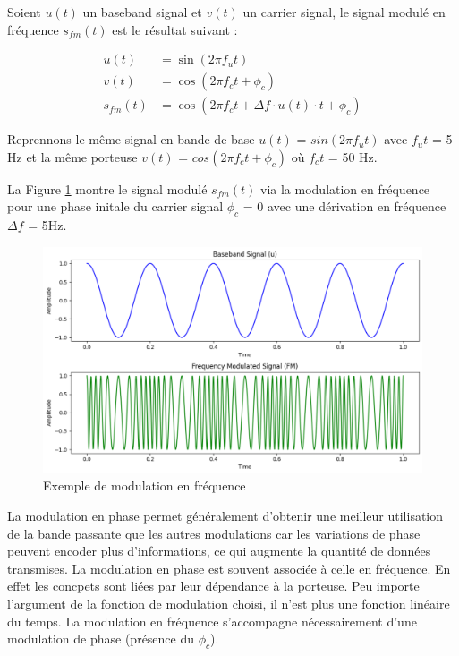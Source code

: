 \vspace{0.1cm}

Soient $u(t)$ un baseband signal et $v(t)$ un carrier signal, le signal modulé en fréquence $s_{fm}(t)$ est le résultat suivant :

\begin{align}
    u(t) &= \sin(2\pi f_{u}t) \\
    v(t) &= \cos(2\pi f_{c}t + \phi_{c}) \\
    s_{fm}(t) &= \cos\left(2\pi f_{c}t + \Delta f \cdot u(t) \cdot t + \phi_{c}\right)
\end{align}

\vspace{0.1cm}

Reprennons le même signal en bande de base 
$u(t)$ = $sin(2\pi f_{u}t)$ avec $f_{u}t$ = 5 Hz et la même porteuse 
$v(t)$ = $cos(2\pi f_{c}t + \phi_{c})$ où $f_{c}t$ = 50 Hz.

\vspace{0.1cm}

La Figure \ref{term2} montre le signal modulé $s_{fm}(t)$ via la modulation en fréquence pour une phase initale du carrier signal $\phi_{c}$ = 0 avec une dérivation en fréquence $\Delta f$ = 5Hz.

\newpage

\begin{figure}[h]
\centering

\includegraphics[scale=0.5]{images/FM_mod.PNG}
\caption{Exemple de modulation en fréquence}\label{term2}
\end{figure}

La modulation en phase permet généralement d'obtenir une meilleur utilisation de la bande passante que les autres modulations car les variations de phase peuvent encoder plus d'informations, ce qui augmente la quantité de données transmises. La modulation en phase est souvent associée à celle en fréquence. En effet les concpets sont liées par leur dépendance à la porteuse. Peu importe l'argument de la fonction de modulation choisi, il n'est plus une fonction linéaire du temps. La modulation en fréquence s'accompagne nécessairement d'une modulation de phase (présence du $\phi_{c}$). 

